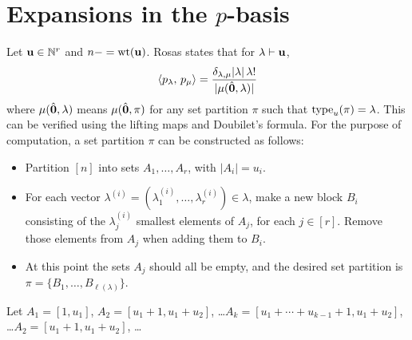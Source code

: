 \section{Expansions in the $p$-basis}

Let $\mathbf{u}\in\mathbb{N}^r$ and $n-=\operatorname{wt}(\mathbf{u})$.
Rosas \cite[p.333]{Rosas} states that for $\lambda\vdash\mathbf{u}$,
\begin{equation}
\langle p_\lambda,\,p_\mu \rangle = \frac{\delta_{\lambda,\mu}|\lambda|\,\lambda!}{|\mu(\hat{\mathbf{0}},\lambda)|}
\end{equation}
where $\mu(\hat{\mathbf{0}},\lambda)$ means $\mu(\hat{\mathbf{0}},\pi)$ for any set partition $\pi$ such that $\operatorname{type}_u(\pi)=\lambda$.  This can be verified using the lifting maps and Doubilet's formula.  For the purpose of computation, a set partition $\pi$ can be constructed as follows:
\begin{itemize}
\item Partition $[n]$ into sets $A_1,\dots,A_r$, with $|A_i|=u_i$.
\item For each vector $\lambda^{(i)}=(\lambda^{(i)}_1,\dots,\lambda^{(i)}_r)\in\lambda$, make a new block $B_i$ consisting of the $\lambda^{(i)}_j$ smallest elements of $A_j$, for each $j\in[r]$.  Remove those elements from $A_j$ when adding them to $B_i$.
\item At this point the sets $A_j$ should all be empty, and the desired set partition is $\pi=\{B_1,\dots,B_{\ell(\lambda)}\}$.
\end{itemize}


Let $A_1=[1,u_1]$, $A_2=[u_1+1,u_1+u_2]$, \dots $A_k=[u_1+\cdots+u_{k-1}+1,u_1+u_2]$, \dots $A_2=[u_1+1,u_1+u_2]$, \dots 


